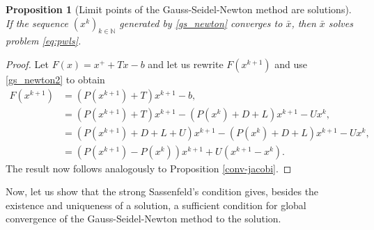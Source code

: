 \documentclass[11pt]{article}
\newtheorem{proposition}{Proposition}[section]
\newcommand{\NN}{\mathbb{N}}
\begin{document}
\begin{proposition}[Limit points of the Gauss-Seidel-Newton method are solutions]
If the sequence $(x^{k})_{k\in\NN}$ generated by \eqref{gs_newton} converges to $\bar x$, then $\bar x$ solves problem \eqref{eq:pwls}.
\end{proposition}
\begin{proof}
Let $F(x) = x^+ + Tx -b$ and let us rewrite $F(x^{k+1})$ and use \eqref{gs_newton2} to obtain
\begin{align*}
F(x^{k+1}) &= (P(x^{k+1})+T)x^{k+1}-b,\\
&= (P(x^{k+1})+T)x^{k+1}-(P(x^{k})+D+L)x^{k+1}-U x^{k},\\
&= (P(x^{k+1})+D+L+U)x^{k+1}-(P(x^{k})+D+L)x^{k+1}-U x^{k},\\
&= (P(x^{k+1})-P(x^{k}))x^{k+1}+U(x^{k+1}-x^{k}).
\end{align*} The result now follows analogously to Proposition \ref{conv-jacobi}.
\end{proof}

Now, let us show that the strong Sassenfeld's condition gives, besides the existence and uniqueness of a solution, a sufficient condition for global convergence of the Gauss-Seidel-Newton method to the solution.
\end{document}
